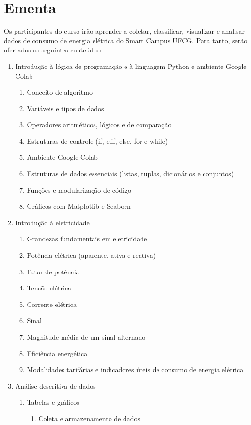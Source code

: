 \section{Ementa}
Os participantes do curso irão aprender a coletar, classificar, visualizar e analisar dados de consumo de energia elétrica do Smart Campus UFCG. Para tanto, serão ofertados os seguintes conteúdos:

\begin{enumerate}
	\item Introdução à lógica de programação e à linguagem Python e ambiente Google Colab
		\begin{enumerate}
			\item Conceito de algoritmo
			\item Variáveis e tipos de dados
			\item Operadores aritméticos, lógicos e de comparação
			\item Estruturas de controle (if, elif, else, for e while)
			\item Ambiente Google Colab
			\item Estruturas de dados essenciais (listas, tuplas, dicionários e conjuntos)
			\item Funções e modularização de código
			\item Gráficos com Matplotlib e Seaborn
		\end{enumerate}
	\item Introdução à eletricidade
		\begin{enumerate}
			\item Grandezas fundamentais em eletricidade
			\item Potência elétrica (aparente, ativa e reativa)
			\item Fator de potência
			\item Tensão elétrica
			\item Corrente elétrica
			\item Sinal
			\item Magnitude média de um sinal alternado
			\item Eficiência energética
			\item Modalidades tarifárias e indicadores úteis de consumo de energia elétrica
		\end{enumerate}
	\item Análise descritiva de dados
		\begin{enumerate}
			\item Tabelas e gráficos
			\begin{enumerate}
				\item Coleta e armazenamento de dados

\end{enumerate}
\end{enumerate}
\end{enumerate}
